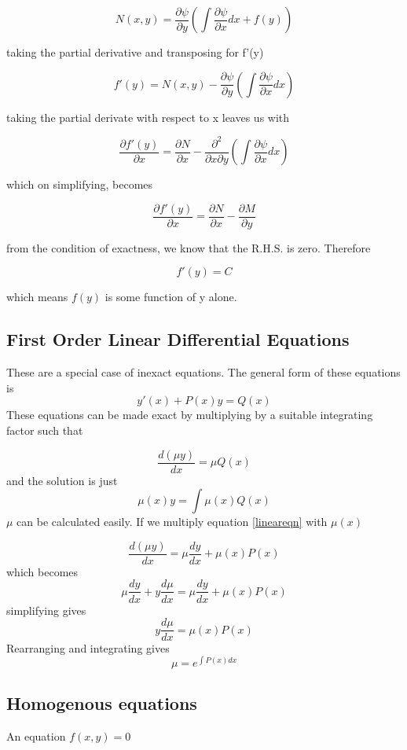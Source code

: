 \documentclass{article}
\begin{document}
	$$ N(x,y) = \frac{\partial\psi}{\partial y} \left(\int \frac{\partial \psi}{\partial x}dx + f(y)\right) $$
	
	taking the partial derivative and transposing for f'(y)
	
	$$ f'(y) = N(x,y) - \frac{\partial\psi}{\partial y} \left(\int \frac{\partial \psi}{\partial x}dx\right) $$
	
	taking the partial derivate with respect to x leaves us with
	
	$$ \frac{\partial f'(y)}{\partial x} = \frac{\partial N}{\partial x} - \frac{\partial^2 }{\partial x \partial y}\left(\int \frac{\partial \psi}{\partial x}dx \right) $$
	
	which on simplifying, becomes
	
	$$ \frac{\partial f'(y)}{\partial x} = \frac{\partial N}{\partial x} - \frac{\partial M}{\partial y} $$
	
	from the condition of exactness, we know that the R.H.S. is zero. Therefore
	
	$$f'(y) = C$$
	
	which means $f(y)$ is some function of y alone.
	
	\subsection{First Order Linear Differential Equations}
	These are a special case of inexact equations. The general form of these equations is
		\begin{equation}
	\label{lineareqn}
	y'(x) + P(x)y = Q(x)
	\end {equation}
	These equations can be made exact by multiplying by a suitable integrating factor such that
	
	$$ \frac{d(\mu y)}{dx} = \mu Q(x)$$
	and the solution is just
	\begin{equation}
	\boxed{\mu (x) y = \int \mu(x) Q(x)}
	\end{equation}
	$\mu$ can be calculated easily. If we multiply equation 
	\ref{lineareqn} with $\mu(x)$
	
	$$ \frac{d(\mu y)}{dx} = \mu \frac{dy}{dx} + \mu (x) P(x) $$ 
	which becomes
	$$ \mu\frac{dy}{dx} + y\frac{d\mu}{dx} = \mu \frac{dy}{dx} + \mu (x) P(x) $$
	simplifying gives
	$$y\frac{d\mu}{dx} = \mu (x)P(x) $$
	Rearranging and integrating gives 
	\begin{equation*}
		\boxed{\mu = e^{\int P(x)dx}}
	\end{equation*}
	\subsection{Homogenous equations}
	An equation $f(x,y)=0$
\end{document}
